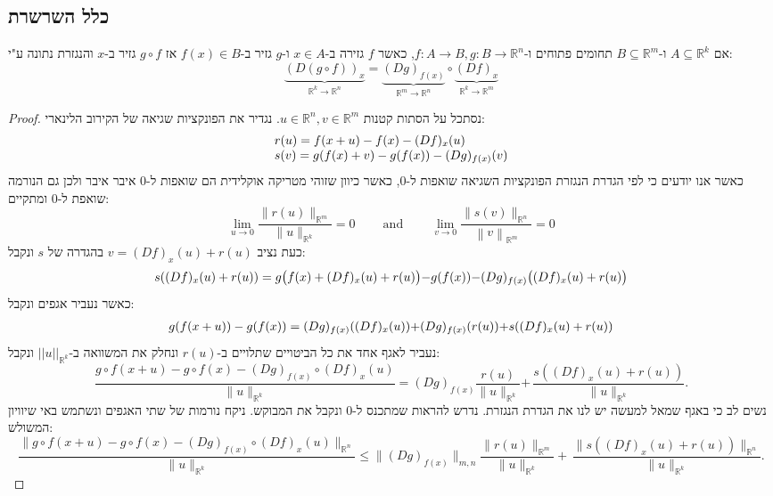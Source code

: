 \documentclass{tstextbook}
\begin{document}
\subsection{כלל השרשרת}

\begin{proposition}
אם \(A\subseteq \mathbb{R}^k\) ו-\(B\subseteq \mathbb{R}^m\) תחומים פתוחים ו-\(f:A\to B,g:B\to\mathbb{R}^n\), כאשר \(f\) גזירה ב-\(x \in A\) ו-\(g\) גזיר ב-\(f(x)\in B\) אז \(g\circ f\) גזיר ב-\(x\) והנגזרת נתונה ע"י:
$$\underbrace{(D(g\circ f))_{x}}_{\mathbb{R}^{k}\to\mathbb{R}^{n}}=\underbrace{(D g)_{f(x)}}_{\mathbb{R}^{m}\to\mathbb{R}^{n}}\circ\underbrace{(D f)_{x}}_{\mathbb{R}^{k}\to\mathbb{R}^{m}}$$

\end{proposition}
\begin{proof}
נסתכל על הסתות קטנות \(u\in\mathbb{R}^n,v\in\mathbb{R}^m\). נגדיר את הפונקציות שגיאה של הקירוב הלינארי:
$$\begin{array}{l c r}{{r(u)=f(x+u)-f(x)-(D f)_{x}(u)}}\\ {{s( v )=g(f(x)+ v )-g(f(x))-(D g)_{f(x)}( v )}}\end{array}$$
כאשר אנו יודעים כי לפי הגדרת הנגזרת הפונקציות השגיאה שואפות ל-0, כאשר כיוון שזוהי מטריקה אוקלידית הם שואפות ל-0 איבר איבר ולכן גם הנורמה שואפת ל-0 ומתקיים:
$$\operatorname*{lim}_{u\to0}{\frac{\|r(u)\|_{\mathbb{R}^{m}}}{\|u\|_{\mathbb{R}^{k}}}}=0\qquad{\mathrm{~and~}}\qquad\operatorname*{lim}_{ v \to0}{\frac{\|s( v )\|_{\mathbb{R}^{n}}}{\left\| v \right\|_{\mathbb{R}^{m}}}}=0$$
כעת נציב \(v=(Df)_{x}(u)+r(u)\) בהגדרה של \(s\) ונקבל:
$$\begin{array}{r l}{s((D f)_{x}(u)+r(u))=g{\big(}f(x)+(D f)_{x}(u)+r(u){\big)}} {-g(f(x))} {-(D g)_{f(x)}{\big(}(D f)_{x}(u)+r(u){\big)}}\end{array}$$
כאשר נעביר אגפים ונקבל:
$$\begin{array}{r l}{g(f(x+u))-g(f(x))=(D g)_{f(x)}((D f)_{x}(u))} {+(D g)_{f(x)}(r(u))} {+s((D f)_{x}(u)+r(u))}\end{array}$$
נעביר לאגף אחד את כל הביטויים שתלויים ב-\(r(u)\) ונחלק את המשוואה ב-\(||u||_{\mathbb{R}^k}\) ונקבל:
$${{\frac{g\circ f(x+u)-g\circ f(x)-(D g)_{f(x)}\circ(D f)_{x}(u)}{\|u\|_{\mathbb{R}^{k}}}=(D g)_{f(x)}{\frac{r(u)}{\|u\|_{\mathbb{R}^{k}}}}}} {{+\,{\frac{s((D f)_{x}(u)+r(u))}{\|u\|_{\mathbb{R}^{k}}}}.}}$$
נשים לב כי באגף שמאל למעשה יש לנו את הגדרת הנגזרת. נדרש להראות שמתכנס ל-0 ונקבל את המבוקש. ניקח נורמות של שתי האגפים ונשתמש באי שיוויון המשולש:
$${\frac{\|g\circ f(x+u)-g\circ f(x)-(D g)_{f(x)}\circ(D f)_{x}(u)\|_{\mathbb{R}^{n}}}{\|u\|_{\mathbb{R}^{k}}}}\leq\|(D g)_{f(x)}\|_{m,n}{\frac{\|r(u)\|_{\mathbb{R}^{m}}}{\|u\|_{\mathbb{R}^{k}}}}+\,{\frac{\|s((D f)_{x}(u)+r(u))\|_{\mathbb{R}^{n}}}{\|u\|_{\mathbb{R}^{k}}}}.$$

\end{proof}
\end{document}
